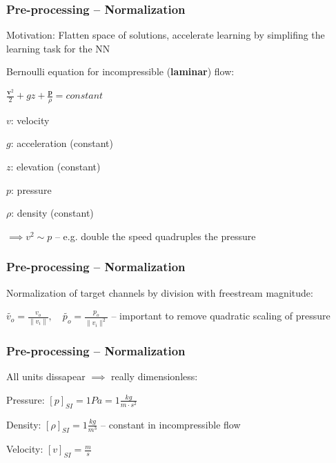 \begin{frame}
    \frametitle{Pre-processing -- Normalization}
\vspace*{0.8cm}

Motivation: Flatten space of solutions, accelerate learning by simplifing the learning task for the NN

Bernoulli equation for incompressible (\textbf{laminar}) flow:

$\frac{\textbf{v}^2}{2} + gz + \frac{\textbf{p}}{\rho} = constant$
\begin{PraesentationAufzaehlung}
\item $v$: velocity
\item $g$: acceleration (constant)
\item $z$: elevation (constant)
\item $p$: pressure
\item $\rho$: density (constant)
\end{PraesentationAufzaehlung}

$\implies v^2 \sim p$ -- e.g. double the speed quadruples the pressure

\end{frame}
\clearpage

\begin{frame}
    \frametitle{Pre-processing -- Normalization}
\vspace*{0.8cm}

Normalization of target channels by division with freestream magnitude: \newline

$\tilde{v_{o}} = \frac{v_{o}}{\|v_{i}\|}, \quad \tilde{p_{o}} = \frac{p_{o}}{\|v_{i}\|^{2}}$ -- important to remove quadratic scaling of pressure


\end{frame}
\clearpage

\begin{frame}
    \frametitle{Pre-processing -- Normalization}
\vspace*{0.8cm}

All units dissapear $\implies$ really dimensionless: \newline
\begin{PraesentationAufzaehlung}
\item Pressure: $[p]_{SI} = 1 Pa = 1 \frac{kg}{m \cdot s^2}$
\item Density: $[\rho]_{SI} = 1 \frac{kg}{m^3}$ -- constant in incompressible flow
\item Velocity: $[v]_{SI} = \frac{m}{s}$
\end{PraesentationAufzaehlung}

\end{frame}
\clearpage

